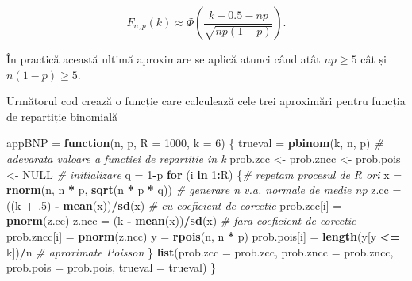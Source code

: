 \documentclass[]{article}
\newenvironment{Shaded}{\begin{snugshade}}{\end{snugshade}}
\newcommand{\CommentTok}[1]{\textcolor[rgb]{0.56,0.35,0.01}{\textit{#1}}}
\newcommand{\ControlFlowTok}[1]{\textcolor[rgb]{0.13,0.29,0.53}{\textbf{#1}}}
\newcommand{\DataTypeTok}[1]{\textcolor[rgb]{0.13,0.29,0.53}{#1}}
\newcommand{\DecValTok}[1]{\textcolor[rgb]{0.00,0.00,0.81}{#1}}
\newcommand{\FloatTok}[1]{\textcolor[rgb]{0.00,0.00,0.81}{#1}}
\newcommand{\KeywordTok}[1]{\textcolor[rgb]{0.13,0.29,0.53}{\textbf{#1}}}
\newcommand{\NormalTok}[1]{#1}
\newcommand{\OperatorTok}[1]{\textcolor[rgb]{0.81,0.36,0.00}{\textbf{#1}}}
\newcommand{\OtherTok}[1]{\textcolor[rgb]{0.56,0.35,0.01}{#1}}
\newcommand{\StringTok}[1]{\textcolor[rgb]{0.31,0.60,0.02}{#1}}
\begin{document}
\[
F_{n,p}(k) \approx \Phi\left(\frac{k+0.5-np}{\sqrt{np(1-p)}}\right).
\]

În practică această ultimă aproximare se aplică atunci când atât
\(np\geq 5\) cât și \(n(1-p)\geq 5\).

Următorul cod crează o funcție care calculează cele trei aproximări
pentru funcția de repartiție binomială

\begin{Shaded}
\begin{Highlighting}[]
\NormalTok{appBNP =}\StringTok{ }\ControlFlowTok{function}\NormalTok{(n, p, }\DataTypeTok{R =} \DecValTok{1000}\NormalTok{, }\DataTypeTok{k =} \DecValTok{6}\NormalTok{) \{}
\NormalTok{  trueval =}\StringTok{ }\KeywordTok{pbinom}\NormalTok{(k, n, p) }\CommentTok{# adevarata valoare a functiei de repartitie in k}
\NormalTok{  prob.zcc <-}\StringTok{ }\NormalTok{prob.zncc <-}\StringTok{ }\NormalTok{prob.pois <-}\StringTok{ }\OtherTok{NULL}  \CommentTok{# initializare}
\NormalTok{  q =}\StringTok{ }\DecValTok{1}\OperatorTok{-}\NormalTok{p}
  \ControlFlowTok{for}\NormalTok{ (i }\ControlFlowTok{in} \DecValTok{1}\OperatorTok{:}\NormalTok{R) \{}\CommentTok{# repetam procesul de R ori }
\NormalTok{    x =}\StringTok{ }\KeywordTok{rnorm}\NormalTok{(n, n }\OperatorTok{*}\StringTok{ }\NormalTok{p, }\KeywordTok{sqrt}\NormalTok{(n }\OperatorTok{*}\StringTok{ }\NormalTok{p }\OperatorTok{*}\StringTok{ }\NormalTok{q)) }\CommentTok{# generare n v.a. normale de medie np }
\NormalTok{    z.cc =}\StringTok{ }\NormalTok{((k }\OperatorTok{+}\StringTok{ }\FloatTok{.5}\NormalTok{) }\OperatorTok{-}\StringTok{ }\KeywordTok{mean}\NormalTok{(x))}\OperatorTok{/}\KeywordTok{sd}\NormalTok{(x) }\CommentTok{# cu coeficient de corectie}
\NormalTok{    prob.zcc[i] =}\StringTok{ }\KeywordTok{pnorm}\NormalTok{(z.cc)}
\NormalTok{    z.ncc =}\StringTok{ }\NormalTok{(k }\OperatorTok{-}\StringTok{ }\KeywordTok{mean}\NormalTok{(x))}\OperatorTok{/}\KeywordTok{sd}\NormalTok{(x) }\CommentTok{# fara coeficient de corectie}
\NormalTok{    prob.zncc[i] =}\StringTok{ }\KeywordTok{pnorm}\NormalTok{(z.ncc)    }
\NormalTok{    y =}\StringTok{ }\KeywordTok{rpois}\NormalTok{(n, n }\OperatorTok{*}\StringTok{ }\NormalTok{p)}
\NormalTok{    prob.pois[i] =}\StringTok{ }\KeywordTok{length}\NormalTok{(y[y }\OperatorTok{<=}\StringTok{ }\NormalTok{k])}\OperatorTok{/}\NormalTok{n }\CommentTok{# aproximate Poisson}
\NormalTok{  \}}
  \KeywordTok{list}\NormalTok{(}\DataTypeTok{prob.zcc =}\NormalTok{ prob.zcc, }\DataTypeTok{prob.zncc =}\NormalTok{ prob.zncc, }
       \DataTypeTok{prob.pois =}\NormalTok{ prob.pois, }\DataTypeTok{trueval =}\NormalTok{ trueval)}
\NormalTok{\}}
\end{Highlighting}
\end{Shaded}
\end{document}
